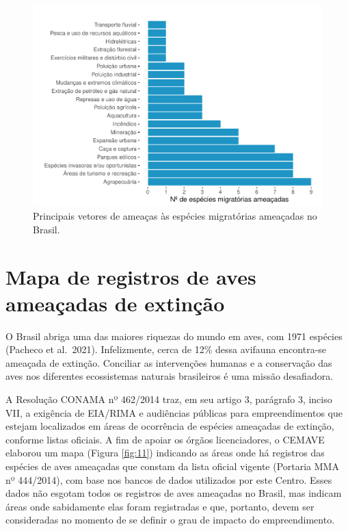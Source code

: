 \documentclass[
  oneside]{scrbook}
\begin{document}
\begin{figure}[H]

{\centering \includegraphics[width=0.85\linewidth]{04-cap03_files/figure-latex/10-1} 

}

\caption{Principais vetores de ameaças às espécies migratórias ameaçadas no Brasil.}\label{fig:10}
\end{figure}

\newpage

\hypertarget{mapa-de-registros-de-aves-ameauxe7adas-de-extinuxe7uxe3o}{%
\section{Mapa de registros de aves ameaçadas de extinção}\label{mapa-de-registros-de-aves-ameauxe7adas-de-extinuxe7uxe3o}}

O Brasil abriga uma das maiores riquezas do mundo em aves, com 1971 espécies (Pacheco et al.~2021). Infelizmente, cerca de 12\% dessa avifauna encontra-se ameaçada de extinção. Conciliar as intervenções humanas e a conservação das aves nos diferentes ecossistemas naturais brasileiros é uma missão desafiadora.

A Resolução CONAMA nº 462/2014 traz, em seu artigo 3, parágrafo 3, inciso VII, a exigência de EIA/RIMA e audiências públicas para empreendimentos que estejam localizados em áreas de ocorrência de espécies ameaçadas de extinção, conforme listas oficiais. A fim de apoiar os órgãos licenciadores, o CEMAVE elaborou um mapa (Figura \ref{fig:11}) indicando as áreas onde há registros das espécies de aves ameaçadas que constam da lista oficial vigente (Portaria MMA nº 444/2014), com base nos bancos de dados utilizados por este Centro. Esses dados não esgotam todos os registros de aves ameaçadas no Brasil, mas indicam áreas onde sabidamente elas foram registradas e que, portanto, devem ser consideradas no momento de se definir o grau de impacto do empreendimento.
\end{document}
